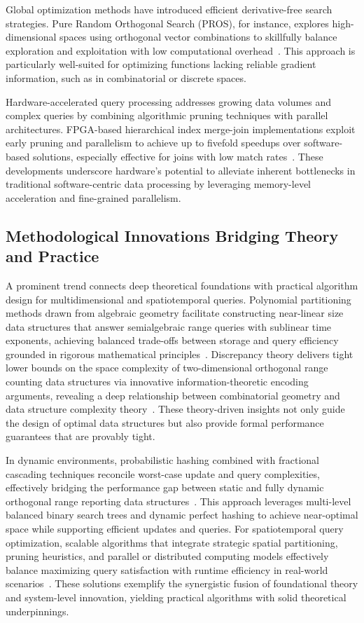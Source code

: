 \documentclass[sigconf]{acmart}
\begin{document}
Global optimization methods have introduced efficient derivative-free search strategies. Pure Random Orthogonal Search (PROS), for instance, explores high-dimensional spaces using orthogonal vector combinations to skillfully balance exploration and exploitation with low computational overhead~\cite{ref11}. This approach is particularly well-suited for optimizing functions lacking reliable gradient information, such as in combinatorial or discrete spaces.

Hardware-accelerated query processing addresses growing data volumes and complex queries by combining algorithmic pruning techniques with parallel architectures. FPGA-based hierarchical index merge-join implementations exploit early pruning and parallelism to achieve up to fivefold speedups over software-based solutions, especially effective for joins with low match rates~\cite{ref27}. These developments underscore hardware's potential to alleviate inherent bottlenecks in traditional software-centric data processing by leveraging memory-level acceleration and fine-grained parallelism.

\subsection{Methodological Innovations Bridging Theory and Practice}

A prominent trend connects deep theoretical foundations with practical algorithm design for multidimensional and spatiotemporal queries. Polynomial partitioning methods drawn from algebraic geometry facilitate constructing near-linear size data structures that answer semialgebraic range queries with sublinear time exponents, achieving balanced trade-offs between storage and query efficiency grounded in rigorous mathematical principles~\cite{ref3}. Discrepancy theory delivers tight lower bounds on the space complexity of two-dimensional orthogonal range counting data structures via innovative information-theoretic encoding arguments, revealing a deep relationship between combinatorial geometry and data structure complexity theory~\cite{ref1}. These theory-driven insights not only guide the design of optimal data structures but also provide formal performance guarantees that are provably tight.

In dynamic environments, probabilistic hashing combined with fractional cascading techniques reconcile worst-case update and query complexities, effectively bridging the performance gap between static and fully dynamic orthogonal range reporting data structures~\cite{ref3}. This approach leverages multi-level balanced binary search trees and dynamic perfect hashing to achieve near-optimal space while supporting efficient updates and queries. For spatiotemporal query optimization, scalable algorithms that integrate strategic spatial partitioning, pruning heuristics, and parallel or distributed computing models effectively balance maximizing query satisfaction with runtime efficiency in real-world scenarios~\cite{ref8}. These solutions exemplify the synergistic fusion of foundational theory and system-level innovation, yielding practical algorithms with solid theoretical underpinnings.
\end{document}
